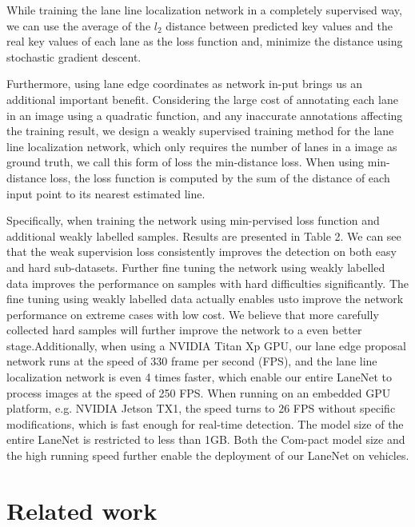 \documentclass[10pt,twocolumn,letterpaper]{article}
\begin{document}
While  training  the  lane  line  localization  network  in  a completely supervised way, we can use the average of the $l_{2}$ distance between predicted key values and the real key values of each lane as the loss function and, minimize the distance using stochastic gradient descent. 

Furthermore, using lane edge coordinates as network in-put brings us an additional important benefit.  Considering the large cost of annotating each lane in an image using a quadratic function, and any inaccurate annotations affecting the training result, we design a weakly supervised training method for the lane line localization network, which only requires the number of lanes in a image as ground truth, we call  this  form  of  loss  the  min-distance  loss.   When  using min-distance loss, the loss function is computed by the sum of the distance of each input point to its nearest estimated line.

Specifically,   when  training  the  network  using  min-pervised loss function and additional weakly labelled samples.   Results  are  presented  in  Table  2.   We  can  see  that the weak supervision loss consistently improves the detection on both easy and hard sub-datasets. Further fine tuning the network using weakly labelled data improves the performance on samples with hard difficulties significantly. The fine tuning using weakly labelled data actually enables usto improve the network performance on extreme cases with low  cost.   We  believe  that  more  carefully  collected  hard samples will further improve the network to a even better stage.Additionally, when using a NVIDIA Titan Xp GPU, our lane edge proposal network runs at the speed of 330 frame per second (FPS), and the lane line localization network is even 4 times faster, which enable our entire LaneNet to process images at the speed of 250 FPS. When running on an embedded  GPU  platform,  e.g.   NVIDIA  Jetson  TX1,  the speed turns to 26 FPS without specific modifications, which is fast enough for real-time detection. The model size of the entire LaneNet is restricted to less than 1GB. Both the Com-pact model size and the high running speed further enable the deployment of our LaneNet on vehicles.

\section{Related work}
\end{document}

